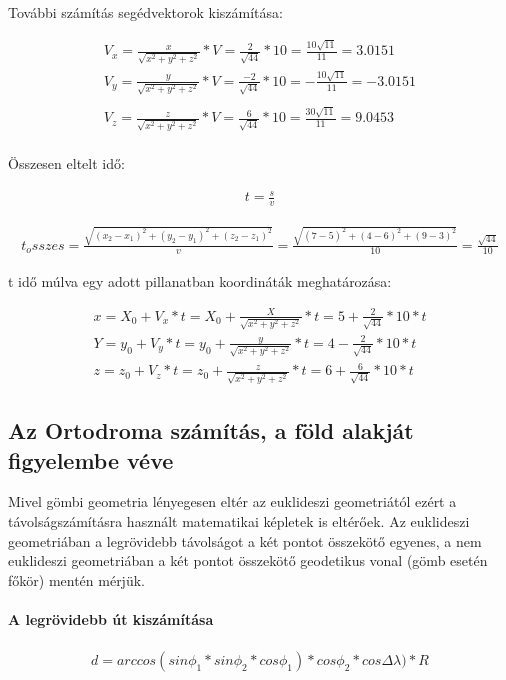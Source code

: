 \newpage

További számítás segédvektorok kiszámítása:

\begin{gather}
    V_x = \frac{x}{\sqrt{x^2 + y^2 + z^2}} *V = \frac{2}{\sqrt{44}} * 10 = \frac{10\sqrt{11}}{11} = 3.0151\\
    V_y = \frac{y}{\sqrt{x^2 + y^2 + z^2}} *V = \frac{-2}{\sqrt{44}} * 10 = -\frac{10\sqrt{11}}{11} = -3.0151\\\\
    V_z = \frac{z}{\sqrt{x^2 + y^2 + z^2}} *V = \frac{6}{\sqrt{44}} * 10 = \frac{30\sqrt{11}}{11} = 9.0453\\
\end{gather}

Összesen eltelt idő:

\begin{gather}
    t = \frac{s}{v}
\end{gather}

\begin{gather}
    t_osszes = \frac{\sqrt{(x_2 - x_1)^2 + (y_2 - y_1)^2 + (z_2 - z_1)^2}}{v} = \frac{\sqrt{(7 - 5)^2 + (4 - 6)^2 + (9 - 3)^2}}{10} = \frac{\sqrt{44}}{10}{}
\end{gather}

t idő múlva egy adott pillanatban koordináták meghatározása:

\begin{gather}
    x = X_0 + V_x * t = X_0 + \frac{X}{\sqrt{x^2 + y^2 + z^2}} * t = 5 + \frac{2}{\sqrt{44}} * 10 * t \\
    Y = y_0 + V_y * t = y_0 + \frac{y}{\sqrt{x^2 + y^2 + z^2}} * t = 4 - \frac{2}{\sqrt{44}} * 10 * t \\
    z = z_0 + V_z * t = z_0 + \frac{z}{\sqrt{x^2 + y^2 + z^2}} * t = 6 + \frac{6}{\sqrt{44}} * 10 * t
\end{gather}

\subsection{Az Ortodroma számítás, a föld alakját figyelembe véve}

Mivel gömbi geometria lényegesen eltér az euklideszi geometriától ezért a távolságszámításra használt matematikai képletek is eltérőek.
Az euklideszi geometriában a legrövidebb távolságot a két pontot összekötő egyenes,
a nem euklideszi geometriában a két pontot összekötő geodetikus vonal (gömb esetén főkör) mentén mérjük.

\paragraph{A legrövidebb út kiszámítása}
\begin{gather}
    d = arccos(sin\phi_1 * sin\phi_2 * cos\phi_1)* cos\phi_2 * cos\Delta \lambda) * R
\end{gather}

